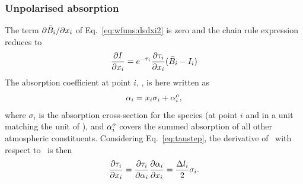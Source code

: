 \subsubsection{Unpolarised absorption}
%

The term $\partial\bar{B}_i/\partial x_{i}$ of Eq.~\ref{eq:wfuns:dsdxi2}
is zero and the chain rule expression reduces to
\begin{equation}
  \frac{\partial I}{\partial x_{i}} =
   e^{-\tau_{i}}\frac{\partial\tau_{i}}{\partial x_{i}}
      (\bar{B}_i-I_{i})  
\end{equation}
The absorption coefficient at point $i$, , is here written as
\begin{equation}
  \label{eq:wfuns:crossec1}
  {\alpha}_{i} = x_{i}\sigma_i + {\alpha}_{i}^o,
\end{equation}
where $\sigma_i$ is the absorption cross-section for the species (at point $i$
and in a unit matching the unit of \SttElm), and ${\alpha}_{i}^o$ covers the
summed absorption of all other atmospheric constituents. Considering
Eq.~\ref{eq:taustep}, the derivative of \ with respect to \
is then 
\begin{equation}
  \frac{\partial\tau_{i}}{\partial x_{i}} = 
  \frac{\partial\tau_{i}}{\partial{\alpha}_{i}} 
  \frac{\partial{\alpha}_{i}}{\partial x_{i}} = 
    \frac{\Delta l_{i}}{2}\sigma_i.
\end{equation}

%


